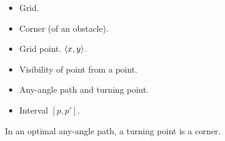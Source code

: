 \begin{itemize}
\item 
  Grid.  
\item 
  Corner (of an obstacle).  
\item 
  Grid point.  
  $\langle x, y\rangle$.  
\item 
  Visibility of point from a point.  
\item 
  Any-angle path and turning point.  
\item 
  Interval $[p,p']$.  
\end{itemize}

\begin{lemm}
  In an optimal any-angle path, 
  a turning point is a corner.  
\end{lemm}

